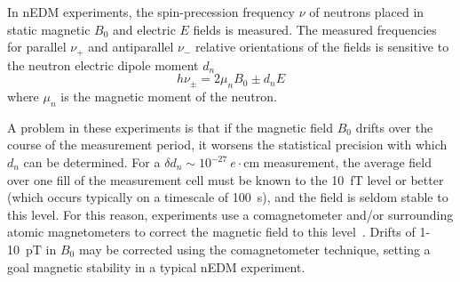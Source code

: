 \documentclass[review]{elsarticle}
\begin{document}

In nEDM experiments, the spin-precession frequency $\nu$ of neutrons
placed in static magnetic $B_0$ and electric $E$ fields is measured.
The measured frequencies for parallel $\nu_+$ and antiparallel $\nu_-$
relative orientations of the fields is sensitive to the neutron
electric dipole moment $d_n$
\begin{equation}
h\nu_\pm=2\mu_nB_0\pm d_nE
\end{equation}
where $\mu_n$ is the magnetic moment of the neutron.






A problem in these experiments is that if the magnetic field $B_0$
drifts over the course of the measurement period, it worsens the
statistical precision with which $d_n$ can be determined.  For a
$\delta d_n\sim 10^{-27}~e\cdot$cm measurement, the average field over
one fill of the measurement cell must be known to the 10~fT level or
better (which occurs typically on a timescale of 100~s), and the field
is seldom stable to this level.  For this reason, experiments use a
comagnetometer and/or surrounding atomic magnetometers to correct the
magnetic field to this level~\cite{bib:nedm4,bib:afach,bib:brys}.
Drifts of 1-10~pT in $B_0$ may be corrected using the comagnetometer
technique, setting a goal magnetic stability in a typical nEDM
experiment.
\end{document}

